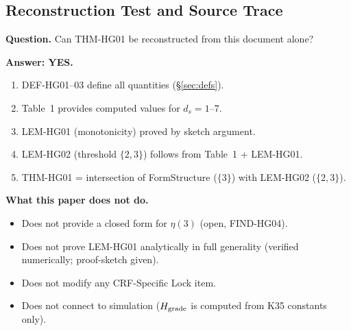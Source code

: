 \documentclass[12pt, a4paper]{article}
\begin{document}
\subsection{Reconstruction Test and Source Trace}
\label{sec:reconstruction}

\begin{formalbox}[title={Reconstruction Test (CUIP No-Loss)}]
\textbf{Question.} Can THM-HG01 be reconstructed from this
document alone?

\textbf{Answer: YES.}
\begin{enumerate}[leftmargin=*]
  \item DEF-HG01--03 define all quantities
    (\S\ref{sec:defs}).
  \item Table~1 provides computed values for $d_s = 1$--$7$.
  \item LEM-HG01 (monotonicity) proved by sketch argument.
  \item LEM-HG02 (threshold $\{2,3\}$) follows from Table~1
    + LEM-HG01.
  \item THM-HG01 = intersection of FormStructure ($\{3\}$) with
    LEM-HG02 ($\{2,3\}$).
\end{enumerate}

\textbf{What this paper does not do.}
\begin{itemize}[leftmargin=*]
  \item Does not provide a closed form for $\eta(3)$
    (open, FIND-HG04).
  \item Does not prove LEM-HG01 analytically in full generality
    (verified numerically; proof-sketch given).
  \item Does not modify any CRF-Specific Lock item.
  \item Does not connect to simulation ($H_{\rm grade}$ is
    computed from K35 constants only).
\end{itemize}
\end{formalbox}
\end{document}
